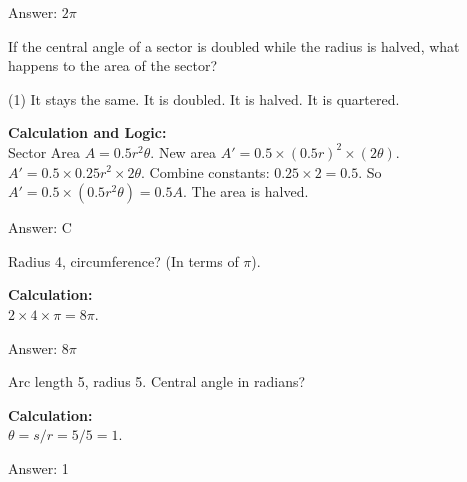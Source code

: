 \documentclass[11pt,paper=a4,answers]{exam}
\begin{document}
\begin{questions}
\begin{solution}
Answer: \colorbox{yellow!100}{$2\pi$}
\end{solution}

\vspace{60pt}

\question
If the central angle of a sector is doubled while the radius is halved, what happens to the area of the sector?
\begin{tasks}(1)
    \task It stays the same.
    \task It is doubled.
    \task It is halved.
    \task It is quartered.
\end{tasks}

\begin{solution}
\textbf{Calculation and Logic:} \\
Sector Area $A = 0.5 r^2 \theta$. New area $A' = 0.5 \times (0.5r)^2 \times (2\theta)$. $A' = 0.5 \times 0.25r^2 \times 2\theta$. Combine constants: $0.25 \times 2 = 0.5$. So $A' = 0.5 \times (0.5 r^2 \theta) = 0.5A$. The area is halved.

\vspace{30pt}

Answer: \colorbox{yellow!100}{C}
\end{solution}

\vspace{60pt}

\question
Radius 4, circumference? (In terms of $\pi$).

\begin{solution}
\textbf{Calculation:} \\
$2 \times 4 \times \pi = 8\pi$.

\vspace{30pt}

Answer: \colorbox{yellow!100}{$8\pi$}
\end{solution}

\vspace{60pt}

\question
Arc length 5, radius 5. Central angle in radians?

\begin{solution}
\textbf{Calculation:} \\
$\theta = s/r = 5/5 = 1$.

\vspace{30pt}

Answer: \colorbox{yellow!100}{1}
\end{solution}


\end{questions}
\end{document}
